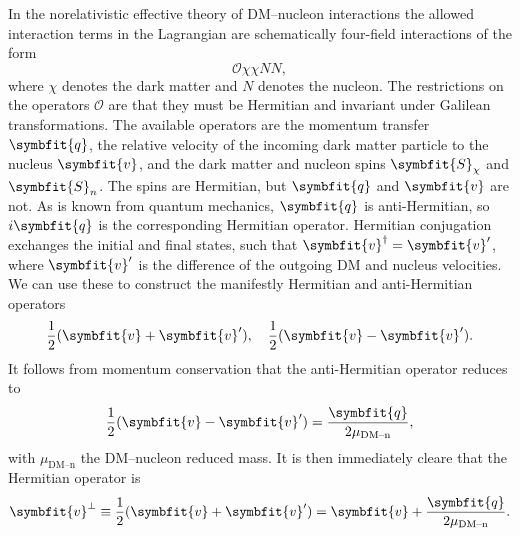 \documentclass[b5paper, 10pt, twoside]{book}
\renewcommand{\vec}[1]{\symbfit{#1}}
\begin{document}
In the norelativistic effective theory of DM--nucleon interactions the allowed interaction terms in the Lagrangian are schematically four-field interactions of the form
\begin{equation}
    \mathcal{O}\chi\chi NN,
\end{equation}
where $\chi$ denotes the dark matter and $N$ denotes the nucleon. The restrictions on the operators $\mathcal{O}$ are that they must be Hermitian and invariant under Galilean transformations. The available operators are the momentum transfer $\vec{q}$, the relative velocity of the incoming dark matter particle to the nucleus $\vec{v}$, and the dark matter and nucleon spins $\vec{S}_\chi$ and $\vec{S}_n$. The spins are Hermitian, but $\vec{q}$ and $\vec{v}$ are not. As is known from quantum mechanics, $\vec{q}$ is anti-Hermitian, so $i\vec{q}$ is the corresponding Hermitian operator. Hermitian conjugation exchanges the initial and final states, such that $\vec{v}^\dagger=\vec{v}'$, where $\vec{v}'$ is the difference of the outgoing DM and nucleus velocities. We can use these to construct the manifestly Hermitian and anti-Hermitian operators
\begin{equation}
    \frac{1}{2}(\vec{v}+\vec{v}'),\quad\frac{1}{2}(\vec{v}-\vec{v}').
\end{equation}
It follows from momentum conservation that the anti-Hermitian operator reduces to
\begin{equation}
\frac{1}{2}(\vec{v}-\vec{v}')=\frac{\vec{q}}{2\mu_\text{DM--n}},
\end{equation}
with $\mu_\text{DM--n}$ the DM--nucleon reduced mass. It is then immediately cleare that the Hermitian operator is
\begin{equation}
\vec{v}^\perp\equiv\frac{1}{2}(\vec{v}+\vec{v}')=\vec{v}+\frac{\vec{q}}{2\mu_\text{DM--n}}.
\end{equation}
\end{document}
